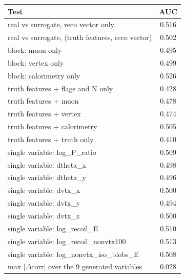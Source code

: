 \begin{tabular}{lc}
\toprule
Test & AUC \\
\midrule
real vs surrogate, reco vector only & 0.516 \\
real vs surrogate, (truth features, reco vector) & 0.502 \\
\midrule
block: muon only & 0.495 \\
block: vertex only & 0.499 \\
block: calorimetry only & 0.526 \\
truth features + flags and N only & 0.428 \\
truth features + muon & 0.478 \\
truth features + vertex & 0.474 \\
truth features + calorimetry & 0.505 \\
truth features + truth only & 0.410 \\
single variable: log\_P\_ratio & 0.509 \\
single variable: dtheta\_x & 0.498 \\
single variable: dtheta\_y & 0.496 \\
single variable: dvtx\_x & 0.500 \\
single variable: dvtx\_y & 0.494 \\
single variable: dvtx\_z & 0.500 \\
single variable: log\_recoil\_E & 0.510 \\
single variable: log\_recoil\_nonvtx100 & 0.513 \\
single variable: log\_nonvtx\_iso\_blobs\_E & 0.508 \\
\midrule
max $|\Delta$corr$|$ over the 9 generated variables & 0.028 \\
\bottomrule
\end{tabular}
